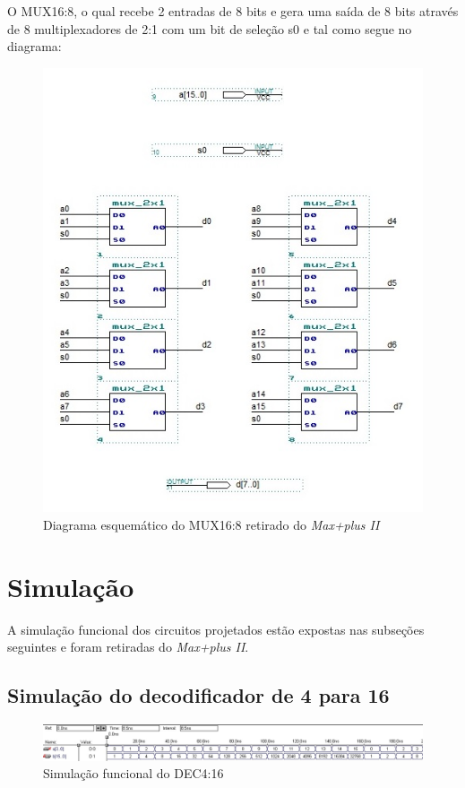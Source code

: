 \documentclass[a4paper]{article}
\begin{document}
	O MUX16:8, o qual recebe 2 entradas de 8 bits e gera uma saída de 8 bits através de 8 multiplexadores de 2:1 com um bit de seleção s0 e tal como segue no diagrama:
\begin{figure}[h]
  \centering
  \includegraphics[scale=0.73]{mux_16-8.jpg}
  \caption{Diagrama esquemático do MUX16:8 retirado do \emph{Max+plus II}}
\end{figure}



\FloatBarrier

\section{Simulação}

	A simulação funcional dos circuitos projetados estão expostas nas subseções seguintes e foram retiradas do \emph{Max+plus II}.

\subsection{Simulação do decodificador de 4 para 16}
\begin{figure}[h]
  \centering
  \includegraphics[scale=0.5]{lab07_simulacao_decodificador.jpg}
  \caption{Simulação funcional do DEC4:16}
\end{figure}
\end{document}
